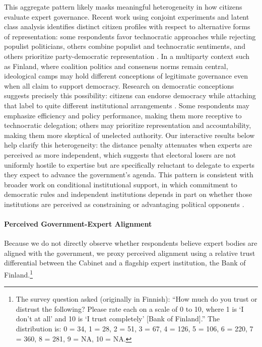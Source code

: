 \documentclass[11pt]{article}\usepackage[]{graphicx}\usepackage[]{xcolor}
\begin{document}
This aggregate pattern likely masks meaningful heterogeneity in how citizens evaluate expert governance. Recent work using conjoint experiments and latent class analysis identifies distinct citizen profiles with respect to alternative forms of representation: some respondents favor technocratic approaches while rejecting populist politicians, others combine populist and technocratic sentiments, and others prioritize party-democratic representation \parencite{Bertsou:2024}. In a multiparty context such as Finland, where coalition politics and consensus norms remain central, ideological camps may hold different conceptions of legitimate governance even when all claim to support democracy. Research on democratic conceptions suggests precisely this possibility: citizens can endorse democracy while attaching that label to quite different institutional arrangements \parencite{Bryan:2023}. Some respondents may emphasize efficiency and policy performance, making them more receptive to technocratic delegation; others may prioritize representation and accountability, making them more skeptical of unelected authority. Our interactive results below help clarify this heterogeneity: the distance penalty attenuates when experts are perceived as more independent, which suggests that electoral losers are not uniformly hostile to expertise but are specifically reluctant to delegate to experts they expect to advance the government's agenda. This pattern is consistent with broader work on conditional institutional support, in which commitment to democratic rules and independent institutions depends in part on whether those institutions are perceived as constraining or advantaging political opponents \parencite{Gessler:2025, van-der-Brug:2021}.

\paragraph{Perceived Government-Expert Alignment}

Because we do not directly observe whether respondents believe expert bodies are aligned with the government, we proxy perceived alignment using a relative trust differential between the Cabinet and a flagship expert institution, the Bank of Finland.\footnote{The survey question asked (originally in Finnish): ``How much do you trust or distrust the following? Please rate each on a scale of 0 to 10, where 1 is `I don't at all' and 10 is `I trust completely' [Bank of Finland].'' The distribution is: 0 = 34, 1 = 28, 2 = 51, 3 = 67, 4 = 126, 5 = 106, 6 = 220, 7 = 360, 8 = 281, 9 = NA, 10 = NA.}
\end{document}
